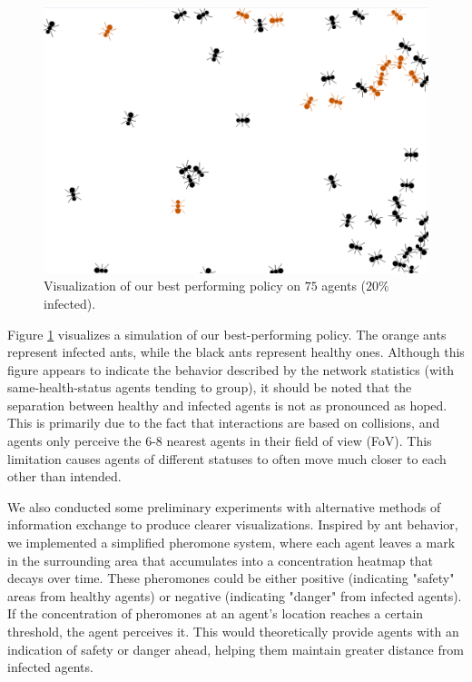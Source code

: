 \documentclass[9pt]{IEEEtran}
\begin{document}
\begin{figure}[hbt]
    \centering
    \includegraphics[width=0.9\linewidth]{trained_viz.png}
    \caption{Visualization of our best performing policy on $75$ agents ($20\%$ infected).}
    \label{fig:trained_viz}
\end{figure}

Figure \ref{fig:trained_viz} visualizes a simulation of our best-performing policy. The orange ants represent infected ants, while the black ants represent healthy ones. Although this figure appears to indicate the behavior described by the network statistics (with same-health-status agents tending to group), it should be noted that the separation between healthy and infected agents is not as pronounced as hoped. This is primarily due to the fact that interactions are based on collisions, and agents only perceive the 6-8 nearest agents in their field of view (FoV). This limitation causes agents of different statuses to often move much closer to each other than intended.

We also conducted some preliminary experiments with alternative methods of information exchange to produce clearer visualizations. Inspired by ant behavior, we implemented a simplified pheromone system, where each agent leaves a mark in the surrounding area that accumulates into a concentration heatmap that decays over time. These pheromones could be either positive (indicating "safety" areas from healthy agents) or negative (indicating "danger" from infected agents). If the concentration of pheromones at an agent's location reaches a certain threshold, the agent perceives it. This would theoretically provide agents with an indication of safety or danger ahead, helping them maintain greater distance from infected agents.
\end{document}
